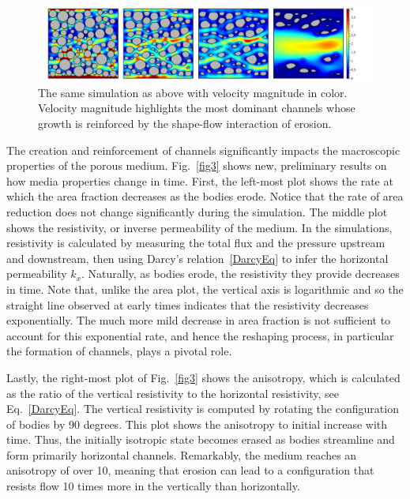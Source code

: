 \documentclass[11pt]{article}
\begin{document}
\begin{figure}%
\begin{center}
\includegraphics[width = 0.99 \textwidth]{./figs/80circ8vel.pdf}
\caption{\label{fig2} The same simulation as above with velocity magnitude in color. Velocity magnitude highlights the most dominant channels whose growth is reinforced by the shape-flow interaction of erosion.}
\end{center}
\end{figure}
 

The creation and reinforcement of channels significantly impacts the macroscopic properties of the porous medium. Fig.~\ref{fig3} shows new, preliminary results on how media properties change in time. First, the left-most plot shows the rate at which the area fraction decreases as the bodies erode. 
Notice that the rate of area reduction does not change significantly during the simulation. The middle plot shows the resistivity, or inverse permeability of the medium. In the simulations, resistivity is calculated by measuring the total flux and the pressure upstream and downstream, then using Darcy's relation~\eqref{DarcyEq} to infer the horizontal permeability $k_x$. Naturally, as bodies erode, the resistivity they provide decreases in time. Note that, unlike the area plot, the vertical axis is logarithmic and so the straight line observed at early times indicates that the resistivity decreases exponentially. The much more mild decrease in area fraction is not sufficient to account for this exponential rate, and hence the reshaping process, in particular the formation of channels, plays a pivotal role.

Lastly, the right-most plot of Fig.~\ref{fig3} shows the anisotropy, which is calculated as the ratio of the vertical resistivity to the horizontal resistivity, see Eq.~\eqref{DarcyEq}. The vertical resistivity is computed by rotating the configuration of bodies by 90 degrees. This plot shows the anisotropy to initial increase with time. Thus, the initially isotropic state becomes erased as bodies streamline and form primarily horizontal channels. Remarkably, the medium reaches an anisotropy of over 10, meaning that erosion can lead to a configuration that resists flow 10 times more in the vertically than horizontally.
\end{document}
